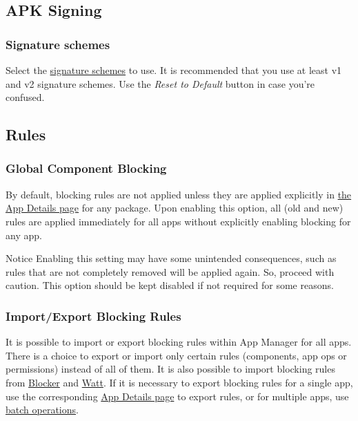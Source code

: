 \subsection{APK Signing}\label{subsec:apk-signing}

\subsubsection{Signature schemes}
Select the \href{https://source.android.com/security/apksigning}{signature schemes} to use. It is recommended that you
use at least v1 and v2 signature schemes. Use the \textit{Reset to Default} button in case you're confused.

\subsection{Rules}\label{subsec:rules}

\subsubsection{Global Component Blocking}\label{subsubsec:instant-component-blocking}
By default, blocking rules are not applied unless they are applied explicitly in \hyperref[sec:app-details-page]{the App
Details page} for any package. Upon enabling this option, all (old and new) rules are applied immediately for all apps
without explicitly enabling blocking for any app.

\begin{warning}{Notice}
    Enabling this setting may have some unintended consequences, such as rules that are not completely removed will be
    applied again. So, proceed with caution. This option should be kept disabled if not required for some reasons.
\end{warning}


\subsubsection{Import/Export Blocking Rules}
It is possible to import or export blocking rules within App Manager for all apps. There is a choice to export or import
only certain rules (components, app ops or permissions) instead of all of them. It is also possible to import blocking
rules from \href{https://github.com/lihenggui/blocker}{Blocker} and \href{https://github.com/tuyafeng/Watt}{Watt}. If it
is necessary to export blocking rules for a single app, use the corresponding \hyperref[sec:app-details-page]{App
Details page} to export rules, or for multiple apps, use \hyperref[subsec:batch-operations]{batch operations}.

